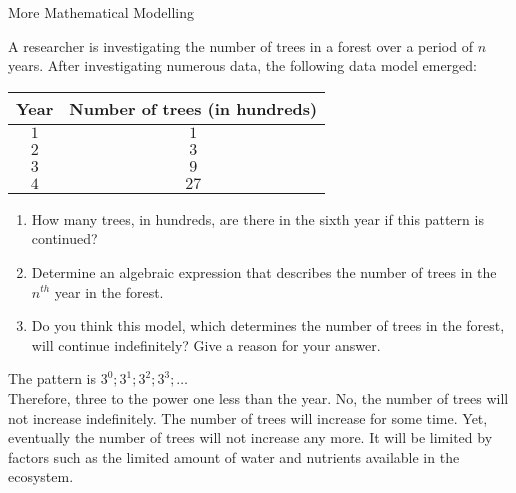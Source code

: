 \begin{wex}{More Mathematical Modelling}
{A researcher is investigating the number of trees in a forest over a period of $n$ years. After investigating numerous data, the following data model emerged:
\begin{center}
\begin{tabular}{|c|c|}\hline
Year& Number of trees (in hundreds)\\\hline
$1$ & $1$\\\hline
$2$ & $3$ \\\hline
$3$ & $9$ \\\hline
$4$ & $27$ \\\hline
\end{tabular}
\end{center}
\begin{enumerate}
\item{How many trees, in hundreds, are there in the sixth year if this pattern is
continued?}
\item{Determine an algebraic expression that describes the number of trees in the $n^{th}$ year in the forest.}
\item{Do you think this model, which determines the number of trees in the forest, will continue indefinitely? Give a reason for your answer.}
\end{enumerate}
}{
The pattern is $3^0; 3^1; 3^2; 3^3;\ldots$\\
Therefore, three to the power one less than the year.
No, the number of trees will not increase indefinitely. The number of trees will increase for some time. Yet, eventually the number of trees will not increase any more. It will be limited by factors such as the limited amount of water and nutrients available in the ecosystem.
}
\end{wex}


